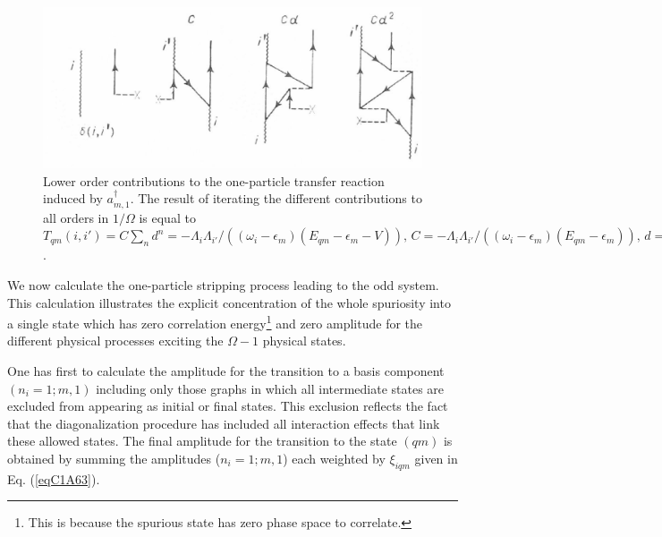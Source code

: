      \begin{figure}
     \centerline {
     \includegraphics*[width=12cm]{introduccion/figs/fig22}
     }
     \caption[Lower order contributions to the one-particle transfer reaction induced by $a^\dagger_{m,1}$.]{Lower order contributions to the one-particle transfer reaction induced by $a^\dagger_{m,1}$. The result of iterating the different contributions to all orders in $1/\Omega$ is equal to $T_{qm}(i,i')=C\sum_nd^n=-\Lambda_i\Lambda_{i'}/\left((\omega_i-\epsilon_m)(E_{qm}-\epsilon_m-V)\right),\,C=-\Lambda_i\Lambda_{i'}/\left((\omega_i-\epsilon_m)(E_{qm}-\epsilon_m)\right),\,d=V/(E_{qm}-\epsilon_m)$.}
     \label{figC1A5}
     \end{figure}
We now calculate the one-particle stripping process leading to the odd system. This calculation illustrates the explicit concentration of the whole spuriosity into a single state which has zero correlation energy\footnote{This is because the spurious state has zero phase space to correlate.} and  zero amplitude for the different physical processes exciting the $\Omega-1$ physical states. 


One has  first to calculate the amplitude for the transition to a basis component $(n_i= 1; m, 1)$ including only those graphs in which all intermediate states are excluded from appearing as initial or final states. This exclusion reflects the fact that the diagonalization procedure has included all interaction effects that link these allowed states. The final amplitude for the transition to the state $(qm)$ is obtained by summing the amplitudes  ($n_i=1;m,1$) each weighted by  $\xi_{iqm}$ given in Eq. (\ref{eqC1A63}). 

